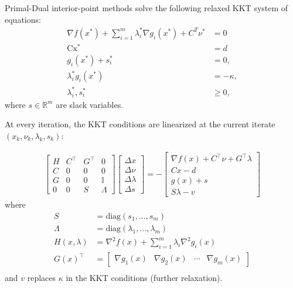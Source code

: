 Primal-Dual interior-point methods solve the following relaxed KKT system of equations:
\begin{align*}
    \nabla f(x^{*})+\sum_{i=1}^{m}\lambda_{i}^{*}\nabla g_{i}(x^{*})+C^{T}\nu^{*} & =0        \\
    \mathrm{Cx^*}                                                                 & =d        \\
    g_i(x^*)+s_i^*                                                                & =0,       \\
    \lambda_{i}^{*}g_{i}(x^{*})                                                   & =-\kappa, \\
    \lambda_{i}^{*},s_{i}^{*}                                                     & \geq0,
\end{align*}
where $s\in \mathbb{R}^m$ are slack variables.

\newpar{}
At every iteration, the KKT conditions are linearized at the current iterate $(x_k, \nu_k, \lambda_k, s_k)$:

\begin{align*}
    \begin{bmatrix}
        H & C^\top & {G}^\top & 0          \\
        C & 0      & 0        & 0          \\
        G & 0      & 0        & \mathbb{I} \\
        0 & 0      & S        & \Lambda
    \end{bmatrix}
    \begin{bmatrix}
        \Delta x      \\
        \Delta\nu     \\
        \Delta\lambda \\
        \Delta s
    \end{bmatrix}=-
    \begin{bmatrix}
        \nabla f(x)+C^\top\nu+{G}^\top\lambda \\
        Cx-d                                  \\
        g(x)+s                                \\
        S\lambda-v
    \end{bmatrix}
\end{align*}
where
\begin{align*}
    S            & = \mathrm{diag}(s_1, \ldots, s_m)                          \\
    \Lambda      & = \mathrm{diag}(\lambda_1, \ldots, \lambda_m)              \\
    H(x,\lambda) & = \nabla^2 f(x) + \sum_{i=1}^{m} \lambda_i \nabla^2 g_i(x) \\
    {G(x)}^\top  & = \begin{bmatrix}
                         \nabla g_1(x) & \nabla g_2(x) & \cdots & \nabla g_m(x)
                     \end{bmatrix}   \\
\end{align*}
and $v$ replaces $\kappa$ in the KKT conditions (further relaxation).


